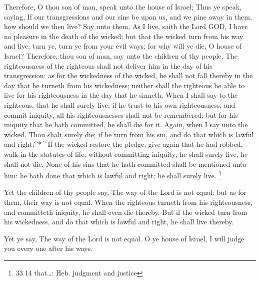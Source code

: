  Therefore, O thou son of man, speak unto the house of
Israel; Thus ye speak, saying, If our transgressions and our sins be
upon us, and we pine away in them, how should we then live?
 Say unto them, As I live, saith the Lord GOD, I have no
pleasure in the death of the wicked; but that the wicked turn from his
way and live: turn ye, turn ye from your evil ways; for why will ye die,
O house of Israel?  Therefore, thou son of man, say unto
the children of thy people, The righteousness of the righteous shall not
deliver him in the day of his transgression: as for the wickedness of
the wicked, he shall not fall thereby in the day that he turneth from
his wickedness; neither shall the righteous be able to live for his
righteousness in the day that he sinneth.  When I shall say
to the righteous, that he shall surely live; if he trust to his own
righteousness, and commit iniquity, all his righteousnesses shall not be
remembered; but for his iniquity that he hath committed, he shall die
for it.  Again, when I say unto the wicked, Thou shalt
surely die; if he turn from his sin, and do that which is lawful and
right;\^{}*\^{}  If the wicked restore the pledge, give
again that he had robbed, walk in the statutes of life, without
committing iniquity; he shall surely live, he shall not die.
 None of his sins that he hath committed shall be mentioned
unto him: he hath done that which is lawful and right; he shall surely
live. \footnote{33.14 that\ldots: Heb. judgment and justice}

 Yet the children of thy people say, The way of the Lord is
not equal: but as for them, their way is not equal.  When
the righteous turneth from his righteousness, and committeth iniquity,
he shall even die thereby.  But if the wicked turn from his
wickedness, and do that which is lawful and right, he shall live
thereby.

 Yet ye say, The way of the Lord is not equal. O ye house
of Israel, I will judge you every one after his ways.

